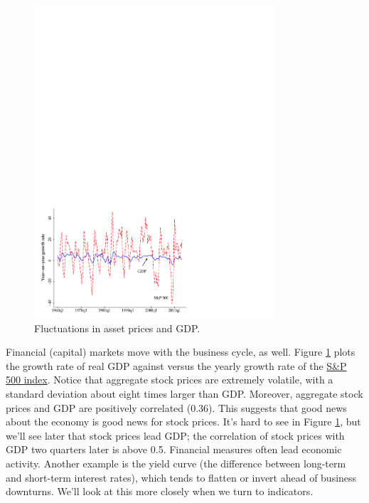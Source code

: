 \begin{figure}[h!]
    \caption{Fluctuations in asset prices and GDP.}
    \label{fig:stock}%
    \centering
    \includegraphics[width=0.8\textwidth]{Figures/us_gdp_sp500.pdf}
\end{figure}

Financial (capital) markets move with the business cycle, as well. Figure \ref{fig:stock} plots the growth rate of real GDP against versus the yearly growth rate of the \href{http://research.stlouisfed.org/fred2/series/SP500}{S\&P 500 index}. Notice that aggregate stock prices are extremely volatile, with a standard deviation about eight times larger than GDP. Moreover, aggregate stock prices and GDP are positively correlated (0.36). This suggests that good news about the economy is good news for stock prices.
It's hard to see in Figure \ref{fig:stock},
but we'll see later that stock prices lead GDP;
the correlation of stock prices with GDP two quarters later is above 0.5. Financial
measures often lead economic activity. Another example is the yield 
 curve (the difference
between long-term and short-term interest rates),
which tends to flatten or invert ahead of business downturns.
We'll look at this more closely when we turn to indicators.


